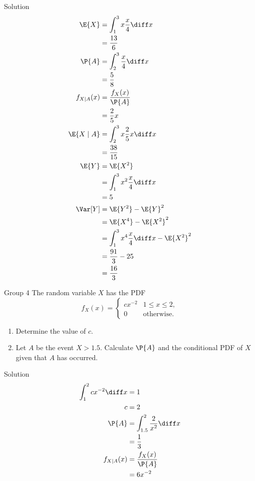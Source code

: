 \documentclass{article}
\theoremstyle{plain}
\theoremstyle{definition}
\theoremstyle{remark}
\begin{document}
\begin{solution}
    {Solution}
    \begin{align*}
        \E{X} &= \int_{1}^{3}x\frac{x}{4}\diff x \\
        &= \frac{13}{6} \\
        \P{A} &= \int_{2}^{3}\frac{x}{4}\diff x \\
        &= \frac{5}{8} \\
        f_{X\mid A}(x) &= \frac{f_X(x)}{\P{A}} \\
        &= \frac{2}{5}x \\
        \E{X\mid A} &= \int_{2}^{3}x\frac{2}{5}x\diff x \\
        &= \frac{38}{15} \\
        \E{Y} &= \E{X^2} \\
        &= \int_{1}^{3}x^2\frac{x}{4}\diff x \\
        &= 5 \\
        \Var[Y] &= \E{Y^2}-\E{Y}^2 \\
        &= \E{X^4}-\E{X^2}^2 \\
        &= \int_{1}^{3}x^4\frac{x}{4}\diff x - \E{X^2}^2 \\
        &= \frac{91}{3}-25 \\
        &= \frac{16}{3}
    \end{align*}
\end{solution}

\begin{problem}
    {Group 4}
    The random variable $X$ has the PDF
    \[
        f_X(x)={
            \begin{cases}
                cx^{-2} & 1\leq x\leq 2,\\
                0 & \text{otherwise.}
            \end{cases}
        }
    \]
    \begin{enumerate}
        \item Determine the value of $c$.
        \item Let $A$ be the event ${X > 1.5}$. Calculate $\P{A}$ and the conditional PDF of $X$ given that $A$ has occurred.
    \end{enumerate}
\end{problem}

\begin{solution}
    {Solution}
    \begin{align*}
        \int_{1}^{2}cx^{-2}\diff x &= 1 \\
        c &= 2 \\
        \P{A} &= \int_{1.5}^{2}\frac{2}{x^2}\diff x \\
        &= \frac{1}{3} \\
        f_{X\mid A}(x) &= \frac{f_X(x)}{\P{A}} \\
        &= 6x^{-2}
    \end{align*}
\end{solution}
\end{document}
